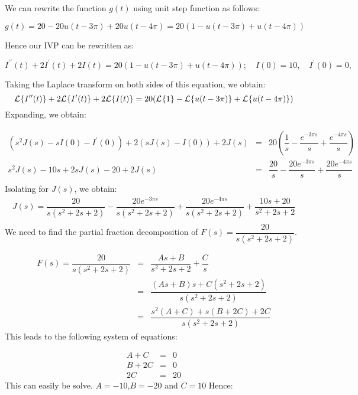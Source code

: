 \documentclass[11pt]{article}
\begin{document}
\begin{solution}
We can rewrite the function $g(t)$ using unit step function as follows:

\begin{equation*}
g(t) = 20-20 u(t-3\pi) +20 u(t-4\pi) = 20(1-u(t-3\pi) + u(t-4\pi))
\end{equation*}

Hence our IVP can be rewritten as:

\begin{equation*}
I^{\prime \prime}(t)+2I^{\prime}(t) +2I(t)=20(1-u(t-3\pi) + u(t-4\pi)); \quad I(0)=10, \quad I^{\prime}(0) = 0,
\end{equation*}

Taking the Laplace transform on both sides of this equation, we obtain:
\begin{equation*}
{\cal L}^{}\{ I^{\prime \prime}(t) \} + 2{\cal L}^{}\{ I^{\prime }(t) \}+2 {\cal L}^{}\{ I(t) \} =20 ( {\cal L}^{}\{ 1 \}- {\cal L}^{}\{ u(t-3\pi) \} + {\cal L}^{}\{ u(t-4\pi) \})
\end{equation*}
Expanding, we obtain:

\begin{eqnarray*}
(s^2J(s)-sI(0)-I^{\prime}(0)) + 2 ( sJ(s)-I(0))+2 J(s) & = & 20 \left( \dfrac{1}{s}- \dfrac{e^{-3\pi s}}{s} + \dfrac{e^{-4\pi s}}{s}\right) \\
s^2J(s)-10s + 2sJ(s)-20+2 J(s) & = & \dfrac{20}{s}- \dfrac{20e^{-3\pi s}}{s} + \dfrac{20e^{-4\pi s}}{s} \\
\end{eqnarray*}
Isolating for $J(s)$, we obtain:
\begin{eqnarray*}
J(s)  =   \dfrac{20}{s(s^2+2s+2)}- \dfrac{20e^{-3\pi s}}{s(s^2+2s+2)} + \dfrac{20e^{-4\pi s}}{s(s^2+2s+2)} + \dfrac{10s+20}{s^2+2s+2}\\
\end{eqnarray*}
We need to find the partial fraction decomposition of  $F(s)=\dfrac{20}{s(s^2+2s+2)}$.

\begin{eqnarray*}
F(s)=\dfrac{20}{s(s^2+2s+2)} & = & \dfrac{As+B}{s^2+2s+2} + \dfrac{C}{s} \\
 & = & \dfrac{(As+B)s+ C(s^2+2s+2)}{s(s^2+2s+2)} \\
 & = & \dfrac{s^2(A+C) + s(B+2C) + 2C }{s(s^2+2s+2)}
\end{eqnarray*}
This leads to the following system of equations:

\begin{eqnarray*}
A+C &= &0\\
B+2C & = & 0\\
2C & = & 20
\end{eqnarray*}
This can easily be solve. $A=-10$,$B=-20$ and $C=10$
Hence:


\end{solution}
\end{document}
